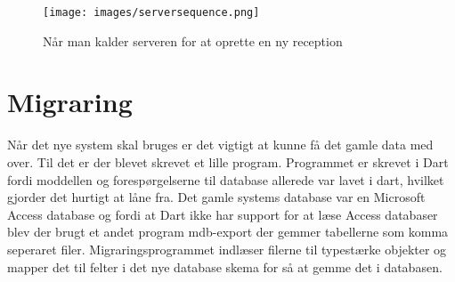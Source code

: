 \begin{figure}[ht!]
\centering
\texttt{[image: images/serversequence.png]}
\caption{Når man kalder serveren for at oprette en ny reception}
\label{fig:serversequence}
\end{figure}

\pagebreak
\section{Migraring}
Når det nye system skal bruges er det vigtigt at kunne få det gamle data med over. Til det er der blevet skrevet et lille program. Programmet er skrevet i Dart fordi moddellen og forespørgelserne til database allerede var lavet i dart, hvilket gjorder det hurtigt at låne fra. Det gamle systems database var en Microsoft Access database og fordi at Dart ikke har support for at læse Access databaser blev der brugt et andet program mdb-export der gemmer tabellerne som komma seperaret filer. Migraringsprogrammet indlæser filerne til typestærke objekter og mapper det til felter i det nye database skema for så at gemme det i databasen.